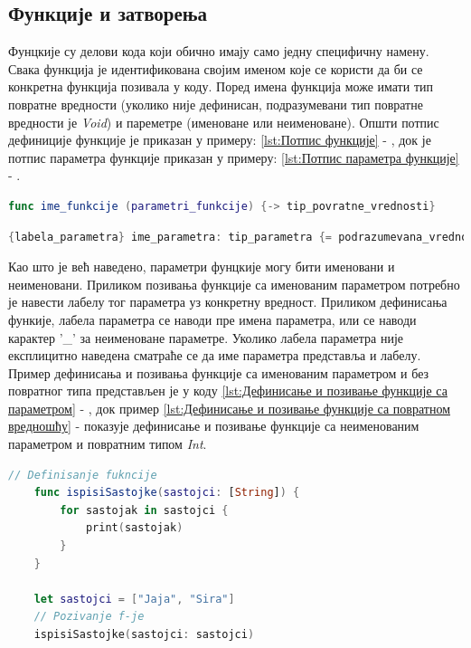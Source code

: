 \documentclass[12pt,oneside]{memoir}
\begin{document}
\subsection{Функције и затворења}

\indent Фунцкије су делови кода који обично имају само једну специфичну намену. Свака функција је идентификована својим именом које се користи да би се конкретна функција позивала у коду. Поред имена функција може имати тип повратне вредности (уколико није дефинисан, подразумевани тип повратне вредности је \textit{Void}) и пареметре (именоване или неименоване). Општи потпис дефиниције функције је приказан у примеру: \ref{lst:Потпис функције} - , док је потпис параметра функције приказан у примеру: \ref{lst:Потпис параметра функције} - .

\begin{lstlisting}[caption=\textit{{Потпис функције}}, label={lst:Потпис функције}, language=Swift, frame=single]
func ime_funkcije (parametri_funkcije) {-> tip_povratne_vrednosti}
\end{lstlisting}

\begin{lstlisting}[caption=\textit{{Потпис параметра функције}}, label={lst:Потпис параметра функције}, language=Swift, frame=single]
{labela_parametra} ime_parametra: tip_parametra {= podrazumevana_vrednost}
\end{lstlisting}

\indent Као што је већ наведено, параметри фунцкије могу бити именовани и неименовани. Приликом позивања функције са именованим параметром потребно је навести лабелу тог параметра уз конкретну вредност. Приликом дефинисања функије, лабела параметра се наводи пре имена параметра, или се наводи карактер '\_' за неименоване параметре. Уколико лабела параметра није експлицитно наведена сматраће се да име параметра представља и лабелу. Пример дефинисања и позивања функције са именованим параметром и без повратног типа представљен је у коду \ref{lst:Дефинисање и позивање функције са параметром} - , док пример \ref{lst:Дефинисање и позивање функције са повратном вредношћу} -  показује дефинисање и позивање функције са неименованим параметром и повратним типом \textit{Int}.

\begin{lstlisting}[caption=\textit{{Дефинисање и позивање функције са параметром}}, label={lst:Дефинисање и позивање функције са параметром}, language=Swift, frame=single]
    // Definisanje fukncije
    func ispisiSastojke(sastojci: [String]) {
        for sastojak in sastojci {
            print(sastojak)
        }
    }
    
    let sastojci = ["Jaja", "Sira"]
    // Pozivanje f-je
    ispisiSastojke(sastojci: sastojci)
\end{lstlisting}
\end{document}
